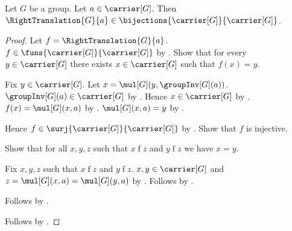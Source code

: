 \begin{theorem}\label{right_translation_bijection}
    Let $G$ be a group.
    Let $a\in\carrier[G]$.
    Then $\RightTranslation{G}{a}\in
        \bijections{\carrier[G]}{\carrier[G]}$.
\end{theorem}
\begin{proof}
    Let $f=\RightTranslation{G}{a}$.
    $f\in\funs{\carrier[G]}{\carrier[G]}$
        by .
    Show that for every $y\in\carrier[G]$ there exists
        $x\in\carrier[G]$ such that $f(x)=y$.
    \begin{subproof}
        Fix $y\in\carrier[G]$.
        Let $x=\mul[G](y,\groupInv[G](a))$.
        $\groupInv[G](a)\in\carrier[G]$
            by .
        Hence $x\in\carrier[G]$
            by .
        $f(x)=\mul[G](x,a)$
            by .
        $\mul[G](x,a)=y$ by .
    \end{subproof}
    Hence $f\in\surj{\carrier[G]}{\carrier[G]}$
        by .
    Show that $f$ is injective.
    \begin{subproof}
        Show that for all $x,y,z$ such that $x\mathrel{f}z$ and
            $y\mathrel{f}z$ we have $x=y$.
        \begin{subproof}
            Fix $x,y,z$ such that $x\mathrel{f}z$ and $y\mathrel{f}z$.
            $x,y\in\carrier[G]$ and
                $z=\mul[G](x,a)=\mul[G](y,a)$
                by .
            Follows by .
        \end{subproof}
        Follows by .
    \end{subproof}
    Follows by .
\end{proof}

